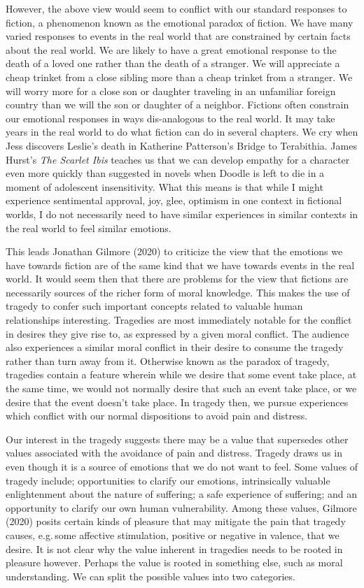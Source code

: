 \documentclass[
  letterpaper,
  DIV=11,
  numbers=noendperiod]{scrartcl}
\theoremstyle{remark}
\begin{document}
However, the above view would seem to conflict with our standard
responses to fiction, a phenomenon known as the emotional paradox of
fiction. We have many varied responses to events in the real world that
are constrained by certain facts about the real world. We are likely to
have a great emotional response to the death of a loved one rather than
the death of a stranger. We will appreciate a cheap trinket from a close
sibling more than a cheap trinket from a stranger. We will worry more
for a close son or daughter traveling in an unfamiliar foreign country
than we will the son or daughter of a neighbor. Fictions often constrain
our emotional responses in ways dis-analogous to the real world. It may
take years in the real world to do what fiction can do in several
chapters. We cry when Jess discovers Leslie's death in Katherine
Patterson's Bridge to Terabithia. James Hurst's \emph{The Scarlet Ibis}
teaches us that we can develop empathy for a character even more quickly
than suggested in novels when Doodle is left to die in a moment of
adolescent insensitivity. What this means is that while I might
experience sentimental approval, joy, glee, optimism in one context in
fictional worlds, I do not necessarily need to have similar experiences
in similar contexts in the real world to feel similar emotions.

This leads Jonathan Gilmore (2020) to criticize the view that the
emotions we have towards fiction are of the same kind that we have
towards events in the real world. It would seem then that there are
problems for the view that fictions are necessarily sources of the
richer form of moral knowledge. This makes the use of tragedy to confer
such important concepts related to valuable human relationships
interesting. Tragedies are most immediately notable for the conflict in
desires they give rise to, as expressed by a given moral conflict. The
audience also experiences a similar moral conflict in their desire to
consume the tragedy rather than turn away from it. Otherwise known as
the paradox of tragedy, tragedies contain a feature wherein while we
desire that some event take place, at the same time, we would not
normally desire that such an event take place, or we desire that the
event doesn't take place. In tragedy then, we pursue experiences which
conflict with our normal dispositions to avoid pain and distress.

Our interest in the tragedy suggests there may be a value that
supersedes other values associated with the avoidance of pain and
distress. Tragedy draws us in even though it is a source of emotions
that we do not want to feel. Some values of tragedy include;
opportunities to clarify our emotions, intrinsically valuable
enlightenment about the nature of suffering; a safe experience of
suffering; and an opportunity to clarify our own human vulnerability.
Among these values, Gilmore (2020) posits certain kinds of pleasure that
may mitigate the pain that tragedy causes, e.g.\,some affective
stimulation, positive or negative in valence, that we desire. It is not
clear why the value inherent in tragedies needs to be rooted in pleasure
however. Perhaps the value is rooted in something else, such as moral
understanding. We can split the possible values into two categories.
\end{document}

